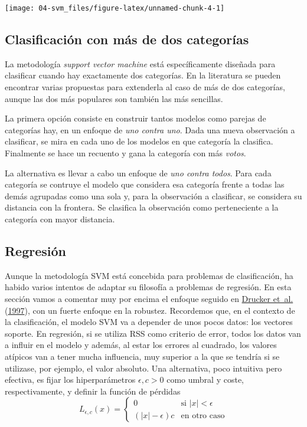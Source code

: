 \documentclass[
  spanish,
]{book}
\theoremstyle{break}
\theoremstyle{definition}
\theoremstyle{definition}
\theoremstyle{definition}
\theoremstyle{definition}
\theoremstyle{remark}
\begin{document}
\begin{center}\texttt{[image: 04-svm\_files/figure-latex/unnamed-chunk-4-1]} \end{center}

\hypertarget{clasificaciuxf3n-con-muxe1s-de-dos-categoruxedas}{%
\subsection{Clasificación con más de dos categorías}\label{clasificaciuxf3n-con-muxe1s-de-dos-categoruxedas}}

La metodología \emph{support vector machine} está específicamente diseñada para clasificar cuando hay exactamente dos categorías. En la literatura se pueden encontrar varias propuestas para extenderla al caso de más de dos categorías, aunque las dos más populares son también las más sencillas.

La primera opción consiste en construir tantos modelos como parejas de categorías hay, en un enfoque de \emph{uno contra uno}. Dada una nueva observación a clasificar, se mira en cada uno de los modelos en que categoría la clasifica. Finalmente se hace un recuento y gana la categoría con más \emph{votos}.

La alternativa es llevar a cabo un enfoque de \emph{uno contra todos}. Para cada categoría se contruye el modelo que considera esa categoría frente a todas las demás agrupadas como una sola y, para la observación a clasificar, se considera su distancia con la frontera. Se clasifica la observación como perteneciente a la categoría con mayor distancia.

\hypertarget{regresiuxf3n}{%
\subsection{Regresión}\label{regresiuxf3n}}

Aunque la metodología SVM está concebida para problemas de clasificación, ha habido varios intentos de adaptar su filosofía a problemas de regresión. En esta sección vamos a comentar muy por encima el enfoque seguido en \protect\hyperlink{ref-drucker1997support}{Drucker et~al.} (\protect\hyperlink{ref-drucker1997support}{1997}), con un fuerte enfoque en la robustez. Recordemos que, en el contexto de la clasificación, el modelo SVM va a depender de unos pocos datos: los vectores soporte. En regresión, si se utiliza RSS como criterio de error, todos los datos van a influir en el modelo y además, al estar los errores al cuadrado, los valores atípicos van a tener mucha influencia, muy superior a la que se tendría si se utilizase, por ejemplo, el valor absoluto. Una alternativa, poco intuitiva pero efectiva, es fijar los hiperparámetros \(\epsilon,c > 0\) como umbral y coste, respectivamente, y definir la función de pérdidas
\[
L_{\epsilon,c} (x) = \left\{ \begin{array}{ll}
  0 & \mbox{si } |x|< \epsilon \\
  (|x| - \epsilon)c & \mbox{en otro caso}
  \end{array}
  \right.
\]
\end{document}
